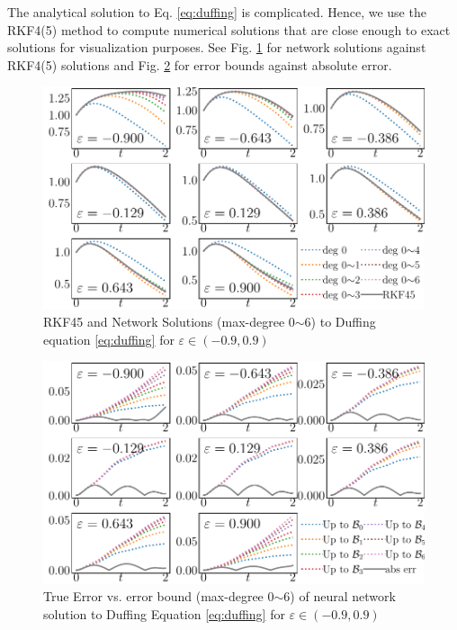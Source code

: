 \documentclass{uai2023}
\begin{document}
    The analytical solution to Eq. \ref{eq:duffing} is complicated. 
    Hence, we use the RKF4(5) method to compute numerical solutions that are close enough to exact solutions for visualization purposes. 
    See Fig. \ref{fig:duffing-solution} for network solutions against RKF4(5) solutions and Fig. \ref{fig:duffing-error} for error bounds against absolute error.
    \begin{figure}[!ht]
        \centering
        \includegraphics[width=\linewidth]{assets/duffing-solution.pdf}
        \caption{\small RKF45 and Network Solutions (max-degree 0$\sim$6) to Duffing equation \ref{eq:duffing} for $\varepsilon \in (-0.9, 0.9)$}\label{fig:duffing-solution}
    \end{figure}
    \begin{figure}[!ht]
        \centering
        \includegraphics[width=\linewidth]{assets/duffing-error.pdf}
        \caption{\small True Error vs. error bound (max-degree 0$\sim$6) of neural network solution to Duffing Equation \ref{eq:duffing} for $\varepsilon \in (-0.9, 0.9)$}\label{fig:duffing-error}
    \end{figure}
\end{document}
